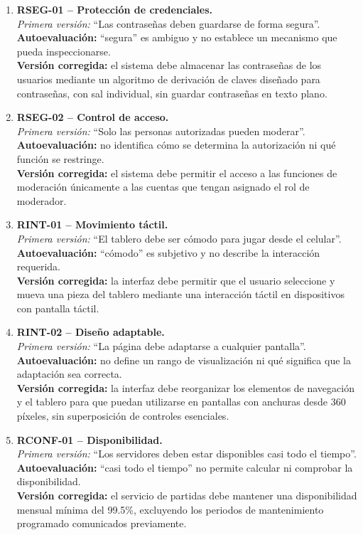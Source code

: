 \documentclass[12pt,a4paper]{article}
\begin{document}
\begin{enumerate}[leftmargin=*]
    \item \textbf{RSEG-01 -- Protección de credenciales.}\\
    \textit{Primera versión:} ``Las contraseñas deben guardarse de forma segura''.\\
    \textbf{Autoevaluación:} ``segura'' es ambiguo y no establece un mecanismo que pueda inspeccionarse.\\
    \textbf{Versión corregida:} el sistema debe almacenar las contraseñas de los usuarios mediante un algoritmo de derivación de claves diseñado para contraseñas, con sal individual, sin guardar contraseñas en texto plano.

    \item \textbf{RSEG-02 -- Control de acceso.}\\
    \textit{Primera versión:} ``Solo las personas autorizadas pueden moderar''.\\
    \textbf{Autoevaluación:} no identifica cómo se determina la autorización ni qué función se restringe.\\
    \textbf{Versión corregida:} el sistema debe permitir el acceso a las funciones de moderación únicamente a las cuentas que tengan asignado el rol de moderador.

    \item \textbf{RINT-01 -- Movimiento táctil.}\\
    \textit{Primera versión:} ``El tablero debe ser cómodo para jugar desde el celular''.\\
    \textbf{Autoevaluación:} ``cómodo'' es subjetivo y no describe la interacción requerida.\\
    \textbf{Versión corregida:} la interfaz debe permitir que el usuario seleccione y mueva una pieza del tablero mediante una interacción táctil en dispositivos con pantalla táctil.

    \item \textbf{RINT-02 -- Diseño adaptable.}\\
    \textit{Primera versión:} ``La página debe adaptarse a cualquier pantalla''.\\
    \textbf{Autoevaluación:} no define un rango de visualización ni qué significa que la adaptación sea correcta.\\
    \textbf{Versión corregida:} la interfaz debe reorganizar los elementos de navegación y el tablero para que puedan utilizarse en pantallas con anchuras desde 360 píxeles, sin superposición de controles esenciales.

    \item \textbf{RCONF-01 -- Disponibilidad.}\\
    \textit{Primera versión:} ``Los servidores deben estar disponibles casi todo el tiempo''.\\
    \textbf{Autoevaluación:} ``casi todo el tiempo'' no permite calcular ni comprobar la disponibilidad.\\
    \textbf{Versión corregida:} el servicio de partidas debe mantener una disponibilidad mensual mínima del 99.5\%, excluyendo los periodos de mantenimiento programado comunicados previamente.


\end{enumerate}
\end{document}
